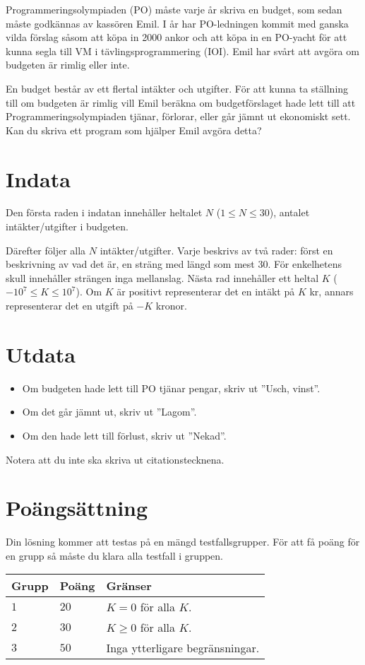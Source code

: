 Programmeringsolympiaden (PO) måste varje år skriva en budget, som sedan måste godkännas av kassören Emil.
I år har PO-ledningen kommit med ganska vilda förslag såsom att köpa in 2000 ankor och att köpa in en PO-yacht för
att kunna segla till VM i tävlingsprogrammering (IOI). Emil har svårt att avgöra om budgeten är rimlig eller inte.

En budget består av ett flertal intäkter och utgifter. 
För att kunna ta ställning till om budgeten är rimlig vill Emil beräkna om budgetförslaget hade lett till
att Programmeringsolympiaden tjänar, förlorar, eller går jämnt ut ekonomiskt sett. Kan du skriva ett program
som hjälper Emil avgöra detta?

\section*{Indata}
Den första raden i indatan innehåller heltalet $N$ ($1 \leq N \leq 30$), antalet intäkter/utgifter i budgeten.

Därefter följer alla $N$ intäkter/utgifter. Varje beskrivs av två rader: först en beskrivning av vad det är, en
sträng med längd som mest $30$. För enkelhetens skull innehåller strängen inga mellanslag.
Nästa rad innehåller ett heltal $K$ ($-10^7 \leq K \leq 10^7$). Om $K$ är positivt
representerar det en intäkt på $K$ kr, annars representerar det en utgift på $-K$ kronor.

\section*{Utdata}
\begin{itemize}
  \item Om budgeten hade lett till PO tjänar pengar, skriv ut ''Usch, vinst''.
  \item Om det går jämnt ut, skriv ut ''Lagom''.
  \item Om den hade lett till förlust, skriv ut ''Nekad''.
\end{itemize}
Notera att du inte ska skriva ut citationstecknena.

\section*{Poängsättning}
Din lösning kommer att testas på en mängd testfallsgrupper.
För att få poäng för en grupp så måste du klara alla testfall i gruppen.

\noindent
\begin{tabular}{| l | l | p{12cm} |}
  \hline
  \textbf{Grupp} & \textbf{Poäng} & \textbf{Gränser} \\ \hline
  $1$    & $20$       & $K = 0$ för alla $K$. \\ \hline 
  $2$    & $30$       & $K \geq 0$ för alla $K$. \\ \hline
  $3$    & $50$       & Inga ytterligare begränsningar. \\ \hline
\end{tabular}

